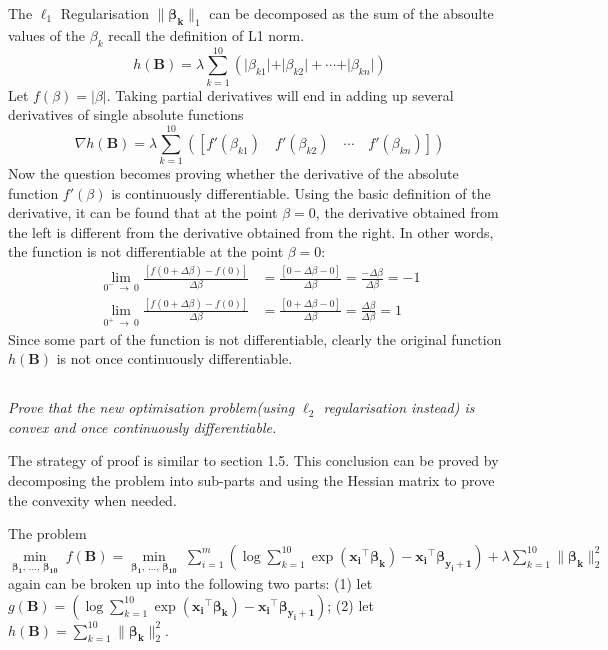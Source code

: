 \documentclass[12pt]{article}
\numberwithin{equation}{section}
\theoremstyle{remark}
\newcommand{\vect}[1]{\boldsymbol{#1}}
\newcommand{\norm}[2]{\|#1\|_{#2}}
\begin{document}
\medskip
The $\ell_1$ Regularisation $\norm{\vect{\beta_k}}{1}$ can be decomposed as the sum of the absoulte values of the $\beta_k$ recall the definition of L1 norm.
\begin{equation}
h(\vect{B}) = \lambda\sum\limits_{k = 1}^{10}\left(\vert\beta_{k1}\vert + \vert\beta_{k2}\vert + \cdots + \vert\beta_{kn}\vert\right)
\end{equation}
Let $f(\beta) = \vert\beta\vert$. Taking partial derivatives will end in adding up several derivatives of single absolute functions
\begin{equation}
\nabla h(\vect{B}) = \lambda\sum\limits_{k = 1}^{10}\left([f'(\beta_{k1})\quad f'(\beta_{k2})\quad \cdots\quad f'(\beta_{kn})]\right) 
\end{equation}
Now the question becomes proving whether the derivative of the absolute function $f'(\beta)$ is continuously differentiable. Using the basic definition of the derivative, it can be found that at the point $\beta = 0$, the derivative obtained from the left is different from the derivative obtained from the right. In other words, the function is not differentiable at the point $\beta = 0$:
\begin{align}
\mathop{lim}\limits_{0^-\ \rightarrow\ 0}\frac{[f(0 + \Delta\beta) - f(0)]}{\Delta\beta} &= \frac{[0 - \Delta\beta - 0]}{\Delta\beta} = \frac{-\Delta\beta}{\Delta\beta} = -1 \\
\mathop{lim}\limits_{0^+\ \rightarrow\ 0}\frac{[f(0 + \Delta\beta) - f(0)]}{\Delta\beta} &= \frac{[0 + \Delta\beta - 0]}{\Delta\beta} = \frac{\Delta\beta}{\Delta\beta} = 1
\end{align}
Since some part of the function is not differentiable, clearly the original function $h(\vect{B})$ is not once continuously differentiable.

\subsection{}
\textit{Prove that the new optimisation problem(using $\ell_2$ regularisation instead) is convex and once continuously differentiable.}

\medskip
The strategy of proof is similar to section 1.5. This conclusion can be proved by decomposing the problem into sub-parts and using the Hessian matrix to prove the convexity when needed.

\medskip
The problem $\min\limits_{\vect{\beta_1}, \, \ldots, \, \vect{\beta_{10}}} \; f(\vect{B}) = \min\limits_{\vect{\beta_1}, \, \ldots, \, \vect{\beta_{10}}} \; \sum\limits_{i = 1}^m \left( \log \sum\limits_{k = 1}^{10} \exp \left( \vect{x_i}^{\top} \vect{\beta_k} \right) - \vect{x_i}^{\top} \vect{\beta_{y_i + 1}} \right) + \lambda \sum\limits_{k = 1}^{10} \norm{\vect{\beta_k}}{2}^{2}$ again can be broken up into the following two parts: (1) let $g(\vect{B}) = \left( \log \sum\limits_{k = 1}^{10} \exp \left( \vect{x_i}^{\top} \vect{\beta_k} \right) - \vect{x_i}^{\top} \vect{\beta_{y_i + 1}} \right)$; (2) let $h(\vect{B}) = \sum\limits_{k = 1}^{10} \norm{\vect{\beta_k}}{2}^{2}$.
\end{document}
